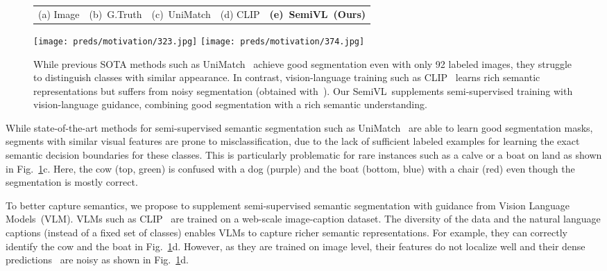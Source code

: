\documentclass[10pt,twocolumn,letterpaper]{article}
\newcommand{\ours}{SemiVL}
\begin{document}
\begin{figure}
    \footnotesize
    \centering
    \setlength{\tabcolsep}{0pt}
    \begin{tabularx}{\linewidth}{*{5}{Y}}
    (a) Image & (b)~G.Truth & (c)~UniMatch & (d) CLIP & \textbf{(e)~\ours\ (Ours)} \\
    \end{tabularx}
    \texttt{[image: preds/motivation/323.jpg]}
    \texttt{[image: preds/motivation/374.jpg]}
    \caption{While previous SOTA methods such as UniMatch~\cite{yang2023revisiting} achieve good segmentation even with only 92 labeled images, they struggle to distinguish classes with similar appearance.
    In contrast, vision-language training such as CLIP~\cite{radford2021learning} learns rich semantic representations but suffers from noisy segmentation (obtained with~\cite{zhou2022extract}). Our \ours\ supplements semi-supervised training with vision-language guidance, combining good segmentation with a rich semantic understanding.}
    \label{fig:motivation}
\end{figure}

While state-of-the-art methods for semi-supervised semantic segmentation such as UniMatch~\cite{yang2023revisiting} are able to learn good segmentation masks, segments with similar visual features are prone to misclassification, due to the lack of sufficient labeled examples for learning the exact semantic decision boundaries for these classes.
This is particularly problematic for rare instances such as a calve or a boat on land as shown in Fig.~\ref{fig:motivation}c. Here, the cow (top, green) is confused with a dog (purple) and the boat (bottom, blue) with a chair (red) even though the segmentation is mostly correct.

To better capture semantics, we propose to supplement semi-supervised semantic segmentation with guidance from Vision Language Models~(VLM). 
VLMs such as CLIP~\cite{radford2021learning} are trained on a web-scale image-caption dataset. The diversity of the data and the natural language captions (instead of a fixed set of classes) enables VLMs to capture richer semantic representations.
For example, they can correctly identify the cow and the boat in Fig.~\ref{fig:motivation}d. However, as they are trained on image level, their features do not localize well and their dense predictions~\cite{maskclip} are noisy as shown in Fig.~\ref{fig:motivation}d. 
\end{document}
